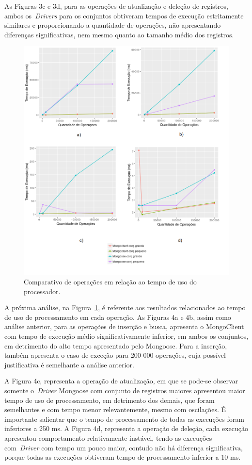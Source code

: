 \documentclass[12pt]{article}
\begin{document}
As Figuras 3c e 3d, para as operações de atualização e deleção de registros, ambos os~\emph{Drivers} para os conjuntos obtiveram tempos de execução estritamente similares e proporcionando a quantidade de operações, não apresentando diferenças significativas, nem mesmo quanto ao tamanho médio dos registros.

\begin{figure}[!ht]
    \centering
    \includegraphics[width=\textwidth]{images/cpuusage}
    \caption{Comparativo de operações em relação ao tempo de uso do processador.}
    \label{fig:cpuusage}
\end{figure}

A próxima análise, na Figura~\ref{fig:cpuusage}, é referente aos resultados relacionados ao tempo de uso de processamento em cada operação.
As Figuras 4a e 4b, assim como análise anterior, para as operações de inserção e busca, apresenta o MongoClient com tempo de execução médio significativamente inferior, em ambos os conjuntos, em detrimento do alto tempo apresentado pelo Mongoose.
Para a inserção, também apresenta o caso de exceção para 200 000 operações, cuja possível justificativa é semelhante a análise anterior.

A Figura 4c, representa a operação de atualização, em que se pode-se observar somente o~\emph{Driver} Mongoose com conjunto de registros maiores apresentou maior tempo de uso de processamento, em detrimento dos demais, que foram semelhantes e com tempo menor relevantemente, mesmo com oscilações. 
É importante salientar que o tempo de processamento de todas as execuções foram inferiores a 250 ms.
A Figura 4d, representa a operação de deleção, cada execução apresentou comportamento relativamente instável, tendo as execuções com~\emph{Driver} com tempo um pouco maior, contudo não há diferença significativa, porque todas as execuções obtiveram tempo de processamento inferior a 10 ms.
\end{document}
